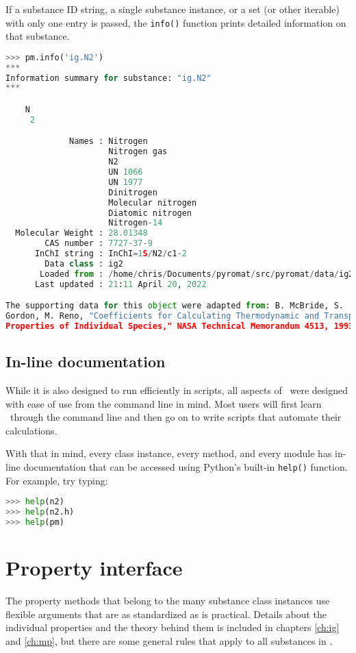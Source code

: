If a substance ID string, a single substance instance, or a set (or other iterable) with only one entry is passed, the \texttt{info()} function prints detailed information on that substance.
\begin{lstlisting}[language=Python,style=tinystyle]
>>> pm.info('ig.N2')
***
Information summary for substance: "ig.N2"
***

    N 
     2

             Names : Nitrogen
                     Nitrogen gas
                     N2
                     UN 1066
                     UN 1977
                     Dinitrogen
                     Molecular nitrogen
                     Diatomic nitrogen
                     Nitrogen-14
  Molecular Weight : 28.01348
        CAS number : 7727-37-9
      InChI string : InChI=1S/N2/c1-2
        Data class : ig2
       Loaded from : /home/chris/Documents/pyromat/src/pyromat/data/ig2/N2.hpd
      Last updated : 21:11 April 20, 2022

The supporting data for this object were adapted from: B. McBride, S.
Gordon, M. Reno, "Coefficients for Calculating Thermodynamic and Transport
Properties of Individual Species," NASA Technical Memorandum 4513, 1993.
\end{lstlisting}

\subsection{In-line documentation}

While it is also designed to run efficiently in scripts, all aspects of \PM\ were designed with ease of use from the command line in mind.  Most users will first learn \PM\ through the command line and then go on to write scripts that automate their calculations.  

With that in mind, every class instance, every method, and every module has in-line documentation that can be accessed using Python's built-in \texttt{help()} function.  For example, try typing:
\begin{lstlisting}[language=Python]
>>> help(n2)
>>> help(n2.h)
>>> help(pm)
\end{lstlisting}

\section{Property interface}

The property methods that belong to the many substance class instances use flexible arguments that are as standardized as is practical.  Details about the individual properties and the theory behind them is included in chapters \ref{ch:ig} and \ref{ch:mp}, but there are some general rules that apply to all substances in \PM.


